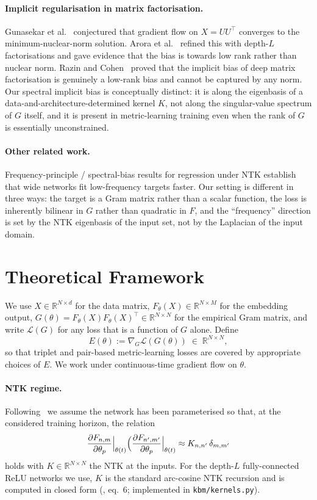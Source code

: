 \documentclass[11pt]{article}
\theoremstyle{definition}
\theoremstyle{plain}
\newcommand{\R}{\mathbb{R}}
\begin{document}
\paragraph{Implicit regularisation in matrix factorisation.}
Gunasekar et al.~\citep{gunasekar2017implicit} conjectured that gradient
flow on $X=UU^\top$ converges to the minimum-nuclear-norm
solution. Arora et al.~\citep{arora2019implicit} refined this with depth-$L$
factorisations and gave evidence that the bias is towards low rank rather
than nuclear norm. Razin and Cohen~\citep{razin2020implicit} proved that the
implicit bias of deep matrix factorisation is genuinely a low-rank bias and
cannot be captured by any norm. Our spectral implicit bias is conceptually
distinct: it is along the eigenbasis of a data-and-architecture-determined
kernel $K$, not along the singular-value spectrum of $G$ itself, and it is
present in metric-learning training even when the rank of $G$ is essentially
unconstrained.

\paragraph{Other related work.}
Frequency-principle / spectral-bias results for regression under NTK
\citep{rahaman2019spectral,basri2020frequency} establish that wide networks
fit low-frequency targets faster. Our setting is different in three ways:
the target is a Gram matrix rather than a scalar function, the loss is
inherently bilinear in $G$ rather than quadratic in $F$, and the
``frequency'' direction is set by the NTK eigenbasis of the input set, not
by the Laplacian of the input domain.

\section{Theoretical Framework}
\label{sec:theory}

We use $X\in\R^{N\times d}$ for the data matrix, $F_\theta(X)\in\R^{N\times M}$
for the embedding output, $G(\theta)=F_\theta(X)F_\theta(X)^\top\in\R^{N\times N}$
for the empirical Gram matrix, and write $\mathcal{L}(G)$ for any loss that is
a function of $G$ alone. Define
\[
   E(\theta):=\nabla_G\mathcal{L}(G(\theta))\;\in\;\R^{N\times N},
\]
so that triplet and pair-based metric-learning losses are covered by
appropriate choices of $E$. We work under continuous-time gradient flow on
$\theta$.

\paragraph{NTK regime.} Following~\citep{jacot2018ntk,lee2019wide} we assume
the network has been parameterised so that, at the considered training
horizon, the relation
\[
   \frac{\partial F_{n,m}}{\partial \theta_p}\Bigl|_{\theta(t)}\Bigl(\frac{\partial F_{n',m'}}{\partial \theta_p}\Bigr|_{\theta(t)} \approx K_{n,n'}\,\delta_{m,m'}
\]
holds with $K\in\R^{N\times N}$ the NTK at the inputs. For the depth-$L$
fully-connected ReLU networks we use, $K$ is the standard arc-cosine NTK
recursion and is computed in closed form (\citealp{jacot2018ntk}, eq.\ 6;
implemented in \texttt{kbm/kernels.py}).
\end{document}
